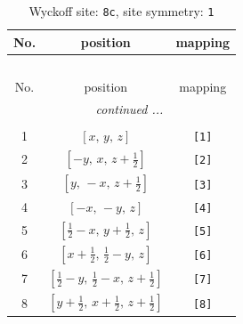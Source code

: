 \documentclass[fleqn,8pt]{jsarticle}
\begin{document}
\renewcommand{\arraystretch}{1.2}
\begin{longtable}{ccc}
\caption{Wyckoff site: {\tt 8c}, site symmetry: {\tt 1}}
 \\
 \hline \hline
No. & position & mapping \\ \hline \endfirsthead

\multicolumn{2}{l}{\tablename\ \thetable{}} \\
 \hline \hline
No. & position & mapping \\ \hline \endhead

 \hline \hline
\multicolumn{2}{r}{\footnotesize\it continued ...} \\ \endfoot

 \hline \hline
\multicolumn{2}{r}{} \\ \endlastfoot

1 & $\left[ x,\, y,\, z \right]$ & {\tt [1]} \\ \hline
2 & $\left[ - y,\, x,\, z + \frac{1}{2} \right]$ & {\tt [2]} \\ \hline
3 & $\left[ y,\, - x,\, z + \frac{1}{2} \right]$ & {\tt [3]} \\ \hline
4 & $\left[ - x,\, - y,\, z \right]$ & {\tt [4]} \\ \hline
5 & $\left[ \frac{1}{2} - x,\, y + \frac{1}{2},\, z \right]$ & {\tt [5]} \\ \hline
6 & $\left[ x + \frac{1}{2},\, \frac{1}{2} - y,\, z \right]$ & {\tt [6]} \\ \hline
7 & $\left[ \frac{1}{2} - y,\, \frac{1}{2} - x,\, z + \frac{1}{2} \right]$ & {\tt [7]} \\ \hline
8 & $\left[ y + \frac{1}{2},\, x + \frac{1}{2},\, z + \frac{1}{2} \right]$ & {\tt [8]} \\
\end{longtable}
\end{document}
